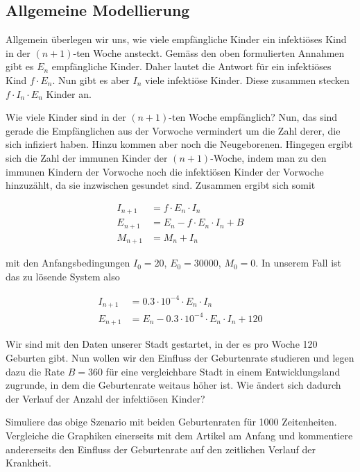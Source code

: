 \documentclass[%
11pt,%
twoside,%
titlepage,%
german,%
headsepline%
]{scrartcl}
\begin{document}
\subsection{Allgemeine Modellierung}

Allgemein überlegen wir uns, wie viele empfängliche Kinder ein infektiöses Kind in der $(n+ 1)$-ten Woche ansteckt. Gemäss den oben formulierten Annahmen gibt es $E_n$ empfängliche Kinder. Daher lautet die Antwort für ein infektiöses Kind $f\cdot E_n$. Nun gibt es aber $I_n$ viele infektiöse Kinder. Diese zusammen stecken $f\cdot I_n\cdot E_n$ Kinder an.

Wie viele Kinder sind in der $(n+1)$-ten Woche empfänglich? Nun, das sind gerade die Empfänglichen aus der Vorwoche vermindert um die Zahl derer, die sich infiziert haben. Hinzu kommen aber noch die Neugeborenen. Hingegen ergibt sich die Zahl der immunen Kinder der $(n+1)$-Woche, indem man zu den immunen Kindern der Vorwoche noch die infektiösen Kinder der Vorwoche hinzuzählt, da sie inzwischen gesundet sind. Zusammen ergibt sich somit

\begin{align*}
I_{n+1} &= f\cdot E_n\cdot I_n\\
E_{n+1} &= E_n-f\cdot E_n\cdot I_n+B\\
M_{n+1} &= M_n+I_n
\end{align*}

mit den Anfangsbedingungen $I_0=20$, $E_0=30000$, $M_0=0$. In unserem Fall ist das zu lösende System also

\begin{align*}
I_{n+1} &= 0.3\cdot10^{-4}\cdot E_n\cdot I_n\\
E_{n+1} &= E_n-0.3\cdot10^{-4}\cdot E_n\cdot I_n+120
\end{align*}

Wir sind mit den Daten unserer Stadt gestartet, in der es pro Woche 120 Geburten gibt. Nun wollen wir den Einfluss der Geburtenrate studieren und legen dazu die Rate $B=360$ für eine vergleichbare Stadt in einem Entwicklungsland zugrunde, in dem die Geburtenrate weitaus höher ist. Wie ändert sich dadurch der Verlauf der Anzahl der infektiösen Kinder?

\begin{ueb}
Simuliere das obige Szenario mit beiden Geburtenraten für 1000 Zeitenheiten. Vergleiche die Graphiken einerseits mit dem Artikel am Anfang und kommentiere andererseits den Einfluss der Geburtenrate auf den zeitlichen Verlauf der Krankheit.
\end{ueb}
\end{document}
